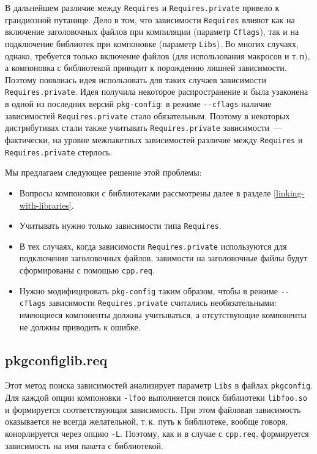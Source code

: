 \documentclass[russian,a4paper,12pt,titlepage]{article}
\begin{document}
В дальнейшем различие между \verb|Requires| и \verb|Requires.private| привело к грандиозной путанице.
Дело в том, что зависимости \verb|Requires| влияют как на включение заголовочных файлов при компиляции (параметр \verb|Cflags|),
так и на подключение библиотек при компоновке (параметр \verb|Libs|).  Во многих случаях, однако, требуется только
включение файлов (для использования макросов и т.\,п), а компоновка с библиотекой приводит к порождению лишней зависимости.
Поэтому появлиась идея использовать для таких случаев зависимости \verb|Requires.private|.
Идея получила некоторое распространение и была узаконена в одной из последних версий \verb|pkg-config|: в режиме
\verb|--cflags| наличие зависимостей \verb|Requires.private| стало обязательным.  Поэтому в некоторых дистрибутивах
стали также учитывать \verb|Requires.private| зависимости~--- фактически, на уровне межпакетных зависимостей различие
между \verb|Requires| и \verb|Requires.private| стерлось.

Мы предлагаем следующее решение этой проблемы:
\begin{itemize}
\item Вопросы компоновки с библиотеками рассмотрены далее в разделе \ref{linking-with-libraries}.
\item Учитывать нужно только зависимости типа \verb|Requires|.
\item В тех случаях, когда зависимости \verb|Requires.private| используются для подключения заголовочных файлов,
завимости на заголовочные файлы будут сформированы с помощью \verb|cpp.req|.
\item Нужно модифицировать \verb|pkg-config| таким образом, чтобы в режиме \verb|--cflags| зависимости
\verb|Requires.private| считались необязательными: имеющиеся компоненты должны учитываться, а отсутствующие
компоненты не должны приводить к ошибке.
\end{itemize}

\subsection{pkgconfiglib.req}
\label{pkgconfiglib-req}
Этот метод поиска зависимостей анализирует параметр \verb|Libs| в файлах \verb|pkgconfig|.
Для каждой опции компоновки \verb|-lfoo| выполняется поиск библиотеки \verb|libfoo.so| и формируется соответствующая зависимость.
При этом файловая зависимость оказывается не всегда желательной, т.\,к. путь к библиотеке, вообще говоря,
конорлируется через опцию \verb|-L|.  Поэтому, как и в случае с \verb|cpp.req|, формируется зависимость на
имя пакета с библиотекой.
\end{document}

